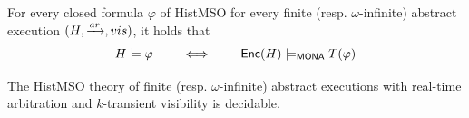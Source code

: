 \begin{theorem}
  For every closed formula $\varphi$ of HistMSO for every finite (resp. $\omega$-infinite) abstract execution $(H,\xrightarrow{ar},vis)$, it holds that
  $$
    H \models \varphi \qquad \iff \qquad \mathsf{Enc}(H) \models_{\mathsf{MONA}} T(\varphi)
  $$
\end{theorem}
\begin{corollary}
  The HistMSO theory of finite (resp. $\omega$-infinite) abstract executions with real-time arbitration and $k$-transient visibility is decidable.
\end{corollary}